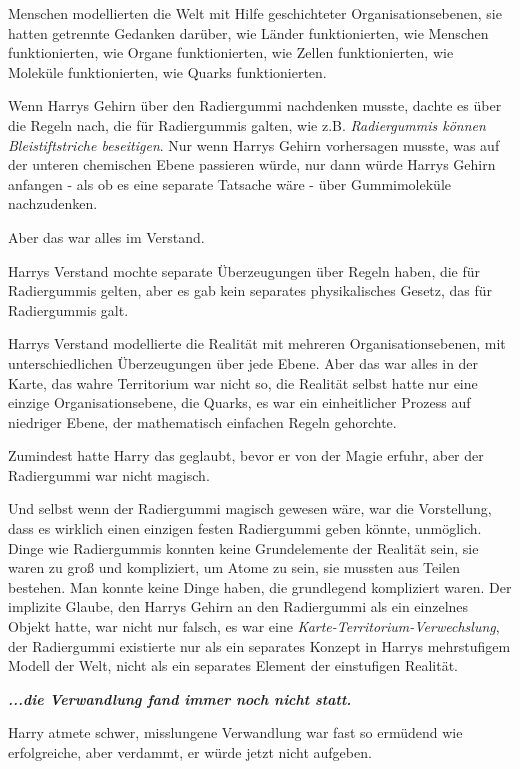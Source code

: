 Menschen modellierten die Welt mit Hilfe geschichteter Organisationsebenen, sie
hatten getrennte Gedanken darüber, wie Länder funktionierten, wie Menschen
funktionierten, wie Organe funktionierten, wie Zellen funktionierten, wie
Moleküle funktionierten, wie Quarks funktionierten.

Wenn Harrys Gehirn über den Radiergummi nachdenken musste, dachte es über die
Regeln nach, die für Radiergummis galten, wie z.B. \emph{\glqq{}Radiergummis
können Bleistiftstriche beseitigen\grqq{}}. Nur wenn Harrys Gehirn vorhersagen
musste, was auf der unteren chemischen Ebene passieren würde, nur dann würde
Harrys Gehirn anfangen - als ob es eine separate Tatsache wäre - über
Gummimoleküle nachzudenken.

Aber das war alles im Verstand.

Harrys Verstand mochte separate Überzeugungen über Regeln haben, die für
Radiergummis gelten, aber es gab kein separates physikalisches Gesetz, das für
Radiergummis galt.

Harrys Verstand modellierte die Realität mit mehreren Organisationsebenen, mit
unterschiedlichen Überzeugungen über jede Ebene. Aber das war alles in der
Karte, das wahre Territorium war nicht so, die Realität selbst hatte nur eine
einzige Organisationsebene, die Quarks, es war ein einheitlicher Prozess auf
niedriger Ebene, der mathematisch einfachen Regeln gehorchte.

Zumindest hatte Harry das geglaubt, bevor er von der Magie erfuhr, aber der
Radiergummi war nicht magisch.

Und selbst wenn der Radiergummi magisch gewesen wäre, war die Vorstellung, dass
es wirklich einen einzigen festen Radiergummi geben könnte, unmöglich. Dinge wie
Radiergummis konnten keine Grundelemente der Realität sein, sie waren zu groß
und kompliziert, um Atome zu sein, sie mussten aus Teilen bestehen. Man konnte
keine Dinge haben, die grundlegend kompliziert waren. Der implizite Glaube, den
Harrys Gehirn an den Radiergummi als ein einzelnes Objekt hatte, war nicht nur
falsch, es war eine \emph{Karte-Territorium-Verwechslung}, der Radiergummi
existierte nur als ein separates Konzept in Harrys mehrstufigem Modell der Welt,
nicht als ein separates Element der einstufigen Realität.

\textbf{\emph{...die Verwandlung fand immer noch nicht statt.}}

Harry atmete schwer, misslungene Verwandlung war fast so ermüdend wie
erfolgreiche, aber verdammt, er würde jetzt nicht aufgeben.

